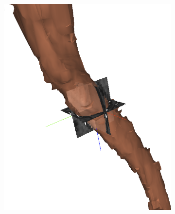 \begin{figure}[htpb]
	\newcommand{\mywidth}{0.26\textwidth}
	\centering
	\hspace{3mm}
	\begin{subfigure}[b]{\mywidth}
		\centering
		\includegraphics[width=\textwidth]{data/images/interpolation/slice_edited.png}
		\caption{\label{fig:3dseg_slice}}
	\end{subfigure}
	\hspace{3mm}
	\begin{subfigure}[b]{\mywidth}
		\centering

\end{subfigure}
\end{figure}
